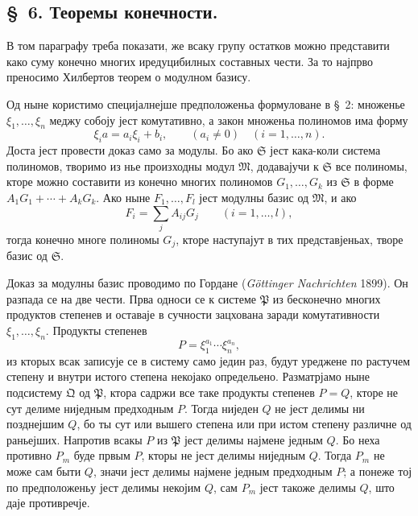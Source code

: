 ﻿\documentclass[11pt]{article}
\providecommand{\mM}{\mathfrak M}
\providecommand{\mS}{\mathfrak S}
\providecommand{\mP}{\mathfrak P}
\providecommand{\mQ}{\mathfrak Q}
\begin{document}

\setcounter{footnote}{14}
\subsection*{\S~6. Теоремы конечности.}

В том параграфу треба показати, же всаку групу остатков можно представити како суму конечно многих иредуцибилных составных чести. За то најпрво преносимо Хилбертов теорем о модулном базису.

Од ныне користимо специјалнејше предположеньа формуловане в \S~2: множенье \(\xi_1,\ldots,\xi_n\) меджу собоју јест комутативно, а закон множеньа полиномов има форму
\begin{equation}
 \xi_i a=a_i\xi_i+b_i,
 \qquad (a_i\ne0)\quad(i=1,\ldots,n).
\tag{6}
\end{equation}
Доста јест провести доказ само за модулы. Бо ако \(\mS\) јест кака-коли система полиномов, творимо из нье произходны модул \(\mM\), додавајучи к \(\mS\) все полиномы, кторе можно составити из конечно многих полиномов \(G_1,\ldots,G_k\) из \(\mS\) в форме \(A_1G_1+\cdots+A_kG_k\). Ако ныне \(F_1,\ldots,F_l\) јест модулны базис од \(\mM\), и ако
\[
 F_i=\sum_j A_{ij}G_j\qquad(i=1,\ldots,l),
\]
тогда конечно многе полиномы \(G_j\), кторе наступајут в тих представјеньах, творе базис од \(\mS\).

Доказ за модулны базис проводимо по Гордане (\emph{Göttinger Nachrichten} 1899). Он разпада се на две чести. Прва односи се к системе \(\mP\) из бесконечно многих продуктов степенев и оставаје в сучности зацхована заради комутативности \(\xi_1,\ldots,\xi_n\). Продукты степенев
\[
 P=\xi_1^{a_1}\cdots\xi_n^{a_n},
\]
из кторых всак записује се в систему само једин раз, будут уреджене по растучем степену и внутри истого степена некојако определьено. Разматрјамо ныне подсистему \(\mQ\) од \(\mP\), ктора садржи все таке продукты степенев \(P=Q\), кторе не сут делиме ниједным предходным \(P\). Тогда ниједен \(Q\) не јест делимы ни позднејшим \(Q\), бо ты сут или вышего степена или при истом степену различне од раньејших. Напротив всакы \(P\) из \(\mP\) јест делимы најмене једным \(Q\). Бо неха противно \(P_m\) буде првым \(P\), кторы не јест делимы ниједным \(Q\). Тогда \(P_m\) не може сам быти \(Q\), значи јест делимы најмене једным предходным \(P\); а понеже тој по предположеньу јест делимы некојим \(Q\), сам \(P_m\) јест такоже делимы \(Q\), што даје противречје.
\end{document}
